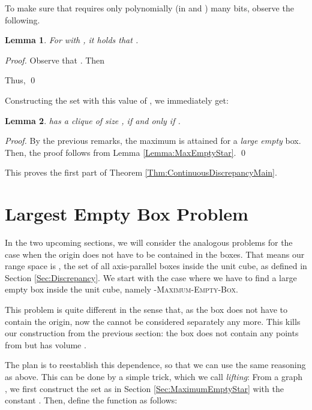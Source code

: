 \documentclass[12pt]{article}
\newtheorem{lemma}{Lemma}
\begin{document}
To make sure that  requires only polynomially (in
 and ) many bits, observe the following.
\begin{lemma}\label{Lemma:Mu} For  with , it holds that .
\end{lemma}
\begin{proof}
Observe that . 
Then 

Thus,
 \qed
\end{proof}

Constructing the set  with this value of , we immediately get:
\begin{lemma}\label{Lemma:StarDisrepancyMain}  has a clique of size , if and only if .
\end{lemma}
\begin{proof} By the previous remarks, the maximum is attained for a \emph{large empty} box. Then, the proof follows from Lemma \ref{Lemma:MaxEmptyStar}. \qed
\end{proof}

This proves the first part of Theorem \ref{Thm:ContinuousDiscrepancyMain}.







\section{Largest Empty Box Problem}\label{Sec:LargestEmptyBox}
In the two upcoming sections, we will consider the analogous problems for the case when the origin does not have to be contained in the boxes. That means our range space is , the set of all axis-parallel boxes inside the unit cube, as defined in Section \ref{Sec:Discrepancy}. We start with the case where we have to find a large empty box inside the unit cube, namely -\textsc{Maximum-Empty-Box}.

This problem is quite different in the sense that, as the box does not have to contain the origin, now the  cannot be considered separately any more. This kills our construction from the previous section: the box  does not contain any points from  but has volume . 

The plan is to reestablish this dependence, so that we can use the same reasoning as above. This can be done by a simple trick, which we call \emph{lifting}: From a graph , we first construct the set  as in Section \ref{Sec:MaximumEmptyStar} with the constant . Then, define the function  as follows: 
\end{document}
